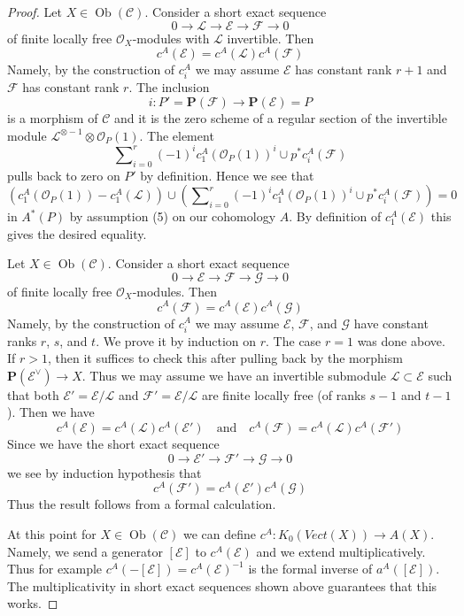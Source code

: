 \documentclass{stacks-project}
\theoremstyle{plain}
\theoremstyle{definition}
\theoremstyle{remark}
\numberwithin{equation}{subsection}
\def\Ob{\mathop{\mathrm{Ob}}\nolimits}
\begin{document}
\begin{proof}
\medskip\noindent
Let $X \in \Ob(\mathcal{C})$. Consider a short exact sequence
$$
0 \to \mathcal{L} \to \mathcal{E} \to \mathcal{F} \to 0
$$
of finite locally free $\mathcal{O}_X$-modules with $\mathcal{L}$ invertible.
Then
$$
c^A(\mathcal{E}) = c^A(\mathcal{L}) c^A(\mathcal{F})
$$
Namely, by the construction of $c^A_i$ we may assume $\mathcal{E}$ has
constant rank $r + 1$ and $\mathcal{F}$ has constant rank $r$.
The inclusion
$$
i : P' = \mathbf{P}(\mathcal{F}) \longrightarrow \mathbf{P}(\mathcal{E}) = P
$$
is a morphism of $\mathcal{C}$ and it is the zero scheme of a regular
section of the invertible module
$\mathcal{L}^{\otimes -1} \otimes \mathcal{O}_P(1)$.
The element
$$
\sum\nolimits_{i = 0}^r (-1)^i c_1^A(\mathcal{O}_P(1))^i \cup
p^*c^A_i(\mathcal{F})
$$
pulls back to zero on $P'$ by definition. Hence we see that
$$
\left(c_1^A(\mathcal{O}_P(1)) - c_1^A(\mathcal{L})\right) \cup
\left(\sum\nolimits_{i = 0}^r (-1)^i c_1^A(\mathcal{O}_P(1))^i \cup
p^*c^A_i(\mathcal{F})\right) = 0
$$
in $A^*(P)$ by assumption (5) on our cohomology $A$.
By definition of $c_1^A(\mathcal{E})$
this gives the desired equality.

\medskip\noindent
Let $X \in \Ob(\mathcal{C})$. Consider a short exact sequence
$$
0 \to \mathcal{E} \to \mathcal{F} \to \mathcal{G} \to 0
$$
of finite locally free $\mathcal{O}_X$-modules. Then
$$
c^A(\mathcal{F}) = c^A(\mathcal{E}) c^A(\mathcal{G})
$$
Namely, by the construction of $c^A_i$ we may assume
$\mathcal{E}$, $\mathcal{F}$, and $\mathcal{G}$ have
constant ranks $r$, $s$, and $t$. We prove it by induction on $r$.
The case $r = 1$ was done above. If $r > 1$, then it suffices to check
this after pulling back by the morphism $\mathbf{P}(\mathcal{E}^\vee) \to X$.
Thus we may assume we have an invertible submodule
$\mathcal{L} \subset \mathcal{E}$ such that both
$\mathcal{E}' = \mathcal{E}/\mathcal{L}$ and
$\mathcal{F}' = \mathcal{E}/\mathcal{L}$ are finite locally free
(of ranks $s - 1$ and $t - 1$). Then we have
$$
c^A(\mathcal{E}) = c^A(\mathcal{L}) c^A(\mathcal{E}')
\quad\text{and}\quad
c^A(\mathcal{F}) = c^A(\mathcal{L}) c^A(\mathcal{F}')
$$
Since we have the short exact sequence
$$
0 \to \mathcal{E}' \to \mathcal{F}' \to \mathcal{G} \to 0
$$
we see by induction hypothesis that
$$
c^A(\mathcal{F}') = c^A(\mathcal{E}') c^A(\mathcal{G})
$$
Thus the result follows from a formal calculation.

\medskip\noindent
At this point for $X \in \Ob(\mathcal{C})$
we can define $c^A : K_0(\textit{Vect}(X)) \to A(X)$.
Namely, we send a generator $[\mathcal{E}]$ to $c^A(\mathcal{E})$
and we extend multiplicatively. Thus for example
$c^A(-[\mathcal{E}]) = c^A(\mathcal{E})^{-1}$ is the formal
inverse of $a^A([\mathcal{E}])$.
The multiplicativity in short exact sequences shown above
guarantees that this works.


\end{proof}
\end{document}

